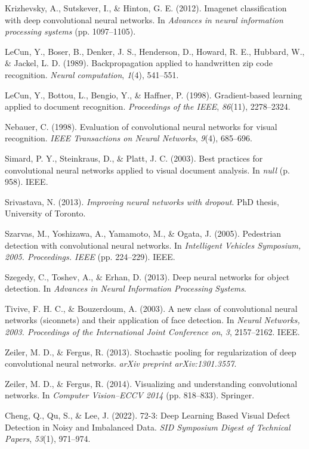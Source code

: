 \documentclass{article}
\begin{document}
\begin{thebibliography}{99}
  Krizhevsky, A., Sutskever, I., \& Hinton, G. E. (2012). Imagenet classification with deep convolutional neural networks. In \textit{Advances in neural information processing systems} (pp. 1097–1105).

 LeCun, Y., Boser, B., Denker, J. S., Henderson, D., Howard, R. E., Hubbard, W., \& Jackel, L. D. (1989). Backpropagation applied to handwritten zip code recognition. \textit{Neural computation}, \textit{1}(4), 541–551.

 LeCun, Y., Bottou, L., Bengio, Y., \& Haffner, P. (1998). Gradient-based learning applied to document recognition. \textit{Proceedings of the IEEE}, \textit{86}(11), 2278–2324.

 Nebauer, C. (1998). Evaluation of convolutional neural networks for visual recognition. \textit{IEEE Transactions on Neural Networks}, \textit{9}(4), 685–696.

 Simard, P. Y., Steinkraus, D., \& Platt, J. C. (2003). Best practices for convolutional neural networks applied to visual document analysis. In \textit{null} (p. 958). IEEE.

 Srivastava, N. (2013). \textit{Improving neural networks with dropout}. PhD thesis, University of Toronto.

 Szarvas, M., Yoshizawa, A., Yamamoto, M., \& Ogata, J. (2005). Pedestrian detection with convolutional neural networks. In \textit{Intelligent Vehicles Symposium, 2005. Proceedings. IEEE} (pp. 224–229). IEEE.

 Szegedy, C., Toshev, A., \& Erhan, D. (2013). Deep neural networks for object detection. In \textit{Advances in Neural Information Processing Systems}.

 Tivive, F. H. C., \& Bouzerdoum, A. (2003). A new class of convolutional neural networks (siconnets) and their application of face detection. In \textit{Neural Networks, 2003. Proceedings of the International Joint Conference on}, \textit{3}, 2157–2162. IEEE.

 Zeiler, M. D., \& Fergus, R. (2013). Stochastic pooling for regularization of deep convolutional neural networks. \textit{arXiv preprint arXiv:1301.3557}.

 Zeiler, M. D., \& Fergus, R. (2014). Visualizing and understanding convolutional networks. In \textit{Computer Vision–ECCV 2014} (pp. 818–833). Springer.

  Cheng, Q., Qu, S., \& Lee, J. (2022). 72-3: Deep Learning Based Visual Defect Detection in Noisy and Imbalanced Data. \textit{SID Symposium Digest of Technical Papers}, \textit{53}(1), 971–974.


\end{thebibliography}
\end{document}
